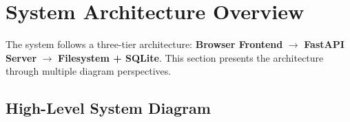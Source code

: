 \documentclass[12pt, a4paper]{article}
\begin{document}
\section{System Architecture Overview}

The system follows a three-tier architecture: \textbf{Browser Frontend} $\rightarrow$ \textbf{FastAPI Server} $\rightarrow$ \textbf{Filesystem + SQLite}. This section presents the architecture through multiple diagram perspectives.

\subsection{High-Level System Diagram}
\end{document}
